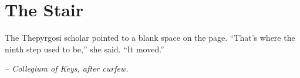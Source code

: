 \chapter*{The Stair}

The Thepyrgosi scholar pointed to a blank space on the page. “That’s where the ninth step used to be,” she said. “It moved.”

\smallskip

\noindent \textit{– Collegium of Keys, after curfew.}

